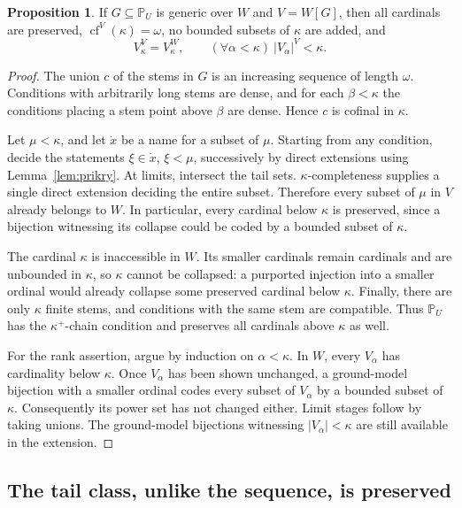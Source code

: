 \documentclass[11pt,letterpaper]{article}
\theoremstyle{definition}
\newtheorem{proposition}[definition]{Proposition}
\numberwithin{equation}{section}
\newcommand{\cf}{\operatorname{cf}}
\newcommand{\PP}{\mathbb P}
\begin{document}
\begin{proposition}\label{prop:prikry-facts}
If $G\subseteq\PP_U$ is generic over $W$ and $V=W[G]$, then all cardinals
are preserved, $\cf^V(\kappa)=\omega$, no bounded subsets of $\kappa$ are
added, and
\[
 V_\kappa^V=V_\kappa^W,\qquad
 (\forall\alpha<\kappa)\ |V_\alpha|^V<\kappa.
\]
\end{proposition}
\begin{proof}
The union $c$ of the stems in $G$ is an increasing sequence of length
$\omega$. Conditions with arbitrarily long stems are dense, and for each
$\beta<\kappa$ the conditions placing a stem point above $\beta$ are dense.
Hence $c$ is cofinal in $\kappa$.

Let $\mu<\kappa$, and let $\dot x$ be a name for a subset of $\mu$.
Starting from any condition, decide the statements $\xi\in\dot x$,
$\xi<\mu$, successively by direct extensions using
Lemma~\ref{lem:prikry}. At limits, intersect the tail sets.
$\kappa$-completeness supplies a single direct extension deciding the entire
subset. Therefore every subset of $\mu$ in $V$ already belongs to $W$.
In particular, every cardinal below $\kappa$ is preserved, since a
bijection witnessing its collapse could be coded by a bounded subset of
$\kappa$.

The cardinal $\kappa$ is inaccessible in $W$. Its smaller cardinals remain
cardinals and are unbounded in $\kappa$, so $\kappa$ cannot be collapsed:
a purported injection into a smaller ordinal would already collapse some
preserved cardinal below $\kappa$. Finally, there are only $\kappa$ finite
stems, and conditions with the same stem are compatible. Thus $\PP_U$
has the $\kappa^+$-chain condition and preserves all cardinals above
$\kappa$ as well.

For the rank assertion, argue by induction on $\alpha<\kappa$.
In $W$, every $V_\alpha$ has cardinality below $\kappa$. Once $V_\alpha$
has been shown unchanged, a ground-model bijection with a smaller ordinal
codes every subset of $V_\alpha$ by a bounded subset of $\kappa$.
Consequently its power set has not changed either. Limit stages follow
by taking unions. The ground-model bijections witnessing
$|V_\alpha|<\kappa$ are still available in the extension.
\end{proof}

\subsection{The tail class, unlike the sequence, is preserved}
\end{document}
